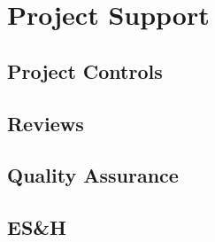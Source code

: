 \section{Project Support}
\label{sec:fdsp-coord-supp}


\subsection{Project Controls}
\label{sec:fdsp-coord-controls}



\subsection{Reviews}
\label{sec:fdsp-coord-reviews}


\subsection{Quality Assurance}
\label{sec:fdsp-coord-qa}


\subsection{ES\&H}
\label{sec:fdsp-coord-esh}


